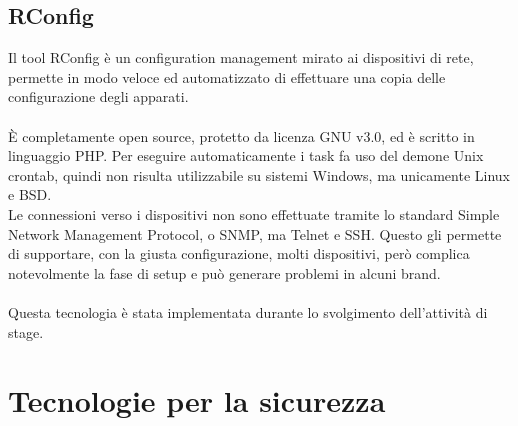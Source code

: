 \documentclass[Tesi.tex]{subfiles}
\begin{document}
\subsection{RConfig}
Il tool RConfig è un configuration management mirato ai dispositivi di rete, permette in modo veloce ed automatizzato di effettuare una copia delle configurazione degli apparati. \\\\
\`{E} completamente open source, protetto da licenza GNU v3.0, ed è scritto in linguaggio PHP. Per eseguire automaticamente i task fa uso del demone Unix crontab, quindi non risulta utilizzabile su sistemi Windows, ma unicamente Linux e BSD. \\
Le connessioni verso i dispositivi non sono effettuate tramite lo standard Simple Network Management Protocol, o SNMP, ma Telnet e SSH. Questo gli permette di supportare, con la giusta configurazione, molti dispositivi, però complica notevolmente la fase di setup e può generare problemi in alcuni brand.\\\\
Questa tecnologia è stata implementata durante lo svolgimento dell'attività di stage.

\newpage
\section{Tecnologie per la sicurezza}
\end{document}
